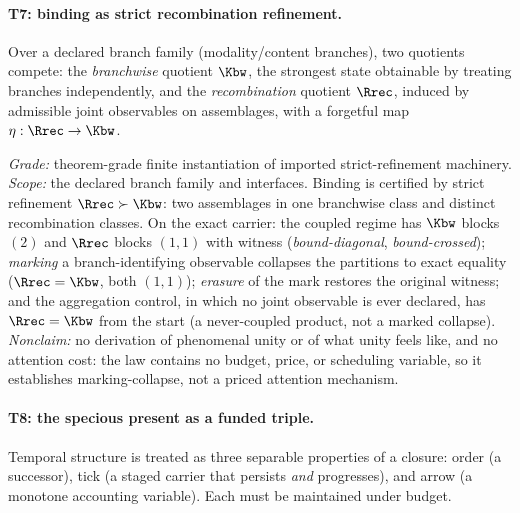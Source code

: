 \paragraph{T7: binding as strict recombination refinement.}
Over a declared branch family (modality/content branches), two quotients
compete: the \emph{branchwise} quotient $\Kbw$, the strongest state obtainable
by treating branches independently, and the \emph{recombination} quotient
$\Rrec$, induced by admissible joint observables on assemblages, with a
forgetful map $\eta : \Rrec \to \Kbw$.

\begin{theorem}
\gradeS{} \emph{Grade:} theorem-grade finite instantiation of imported
strict-refinement machinery. \emph{Scope:} the declared branch family and
interfaces. Binding is certified by strict refinement $\Rrec \succ \Kbw$: two
assemblages in one branchwise class and distinct recombination classes. On
the exact carrier: the coupled regime has $\Kbw$ blocks $(2)$ and $\Rrec$
blocks $(1,1)$ with witness (\emph{bound-diagonal}, \emph{bound-crossed});
\emph{marking} a branch-identifying observable collapses the partitions to
exact equality ($\Rrec = \Kbw$, both $(1,1)$); \emph{erasure} of the mark
restores the original witness; and the aggregation control, in which no joint
observable is ever declared, has $\Rrec = \Kbw$ from the start (a
never-coupled product, not a marked collapse). \emph{Nonclaim:} no derivation
of phenomenal unity or of what unity feels like, and no attention cost:
the law contains no budget, price, or scheduling variable, so it establishes
marking-collapse, not a priced attention mechanism.
\end{theorem}

\paragraph{T8: the specious present as a funded triple.}
Temporal structure is treated as three separable properties of a closure:
order (a successor), tick (a staged carrier that persists \emph{and}
progresses), and arrow (a monotone accounting variable). Each must
be maintained under budget.

